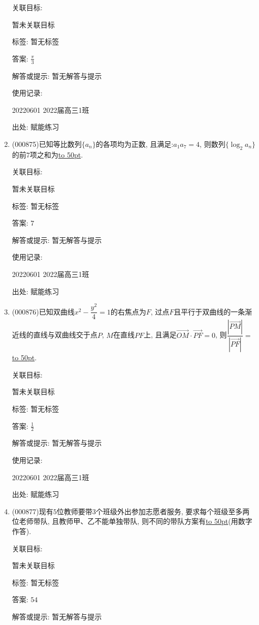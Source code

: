 \documentclass[10pt,a4paper]{article}
\newcommand{\blank}[1]{\underline{\hbox to #1pt{}}}
\begin{document}
\begin{enumerate}[1.]
关联目标:

暂未关联目标



标签: 暂无标签

答案: $\frac{\pi }3$

解答或提示: 暂无解答与提示

使用记录:

20220601	2022届高三1班	


出处: 赋能练习
\item { (000875)}已知等比数列$\{a_n\}$的各项均为正数, 且满足:$a_1a_7=4$, 则数列$\{\log_2a_n\}$的前$7$项之和为\blank{50}.


关联目标:

暂未关联目标



标签: 暂无标签

答案: $7$

解答或提示: 暂无解答与提示

使用记录:

20220601	2022届高三1班	


出处: 赋能练习
\item { (000876)}已知双曲线$x^2-\dfrac{y^2}4=1$的右焦点为$F$, 过点$F$且平行于双曲线的一条渐近线的直线与双曲线交于点$P$, $M$在直线$PF$上, 且满足$\overrightarrow{OM}\cdot \overrightarrow{PF}=0$, 则$\dfrac{|\overrightarrow{PM}|}{|\overrightarrow{PF}|}=$\blank{50}.


关联目标:

暂未关联目标



标签: 暂无标签

答案: $\frac 12$

解答或提示: 暂无解答与提示

使用记录:

20220601	2022届高三1班	


出处: 赋能练习
\item { (000877)}现有$5$位教师要带$3$个班级外出参加志愿者服务, 要求每个班级至多两位老师带队, 且教师甲、乙不能单独带队, 则不同的带队方案有\blank{50}(用数字作答).


关联目标:

暂未关联目标



标签: 暂无标签

答案: $54$

解答或提示: 暂无解答与提示


\end{enumerate}
\end{document}
